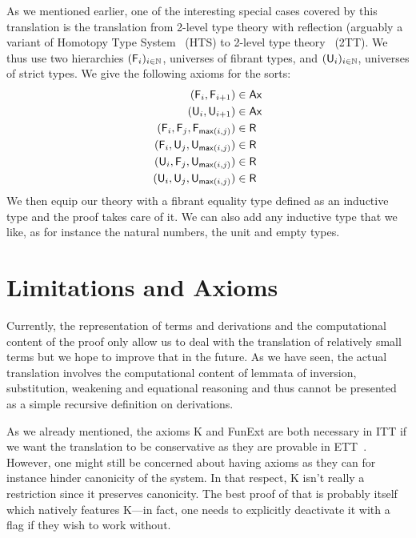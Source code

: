 
As we mentioned earlier, one of the interesting special cases covered by this
translation is the translation from 2-level type theory with reflection
(arguably a variant of Homotopy Type System~\cite{hts-sota} (HTS) to 2-level
type theory~\cite{altenkirch2016extending} (2TT).
%
We thus use two hierarchies $(\mathsf{F}_{i})_{i \in \mathbb{N}}$, universes of fibrant
types, and $(\mathsf{U}_{i})_{i \in \mathbb{N}}$, universes of strict types.
We give the following axioms for the sorts:
%
\begin{align*}
  (\mathsf{F}_{i}, \mathsf{F}_{i+1}) &\in \mathsf{Ax} \\
  (\mathsf{U}_{i}, \mathsf{U}_{i+1}) &\in \mathsf{Ax} \\
  (\mathsf{F}_{i}, \mathsf{F}_{j}, \mathsf{F}_{\mathsf{max}(i,j)}) &\in \mathsf{R} \\
  (\mathsf{F}_{i}, \mathsf{U}_{j}, \mathsf{U}_{\mathsf{max}(i,j)}) &\in \mathsf{R} \\
  (\mathsf{U}_{i}, \mathsf{F}_{j}, \mathsf{U}_{\mathsf{max}(i,j)}) &\in \mathsf{R} \\
  (\mathsf{U}_{i}, \mathsf{U}_{j}, \mathsf{U}_{\mathsf{max}(i,j)}) &\in \mathsf{R}
\end{align*}
%
We then equip our theory with a fibrant equality type defined as an inductive
type and the proof takes care of it. We can also add any inductive type that we
like, as for instance the natural numbers, the unit and empty types.

\section{Limitations and Axioms}
\label{sec:axioms}

Currently, the representation of terms and derivations and the
computational content of the proof only allow us to deal with the
translation of relatively small terms but we hope to improve that in
the future. As we have seen, the actual translation involves the
computational content of lemmata of inversion, substitution, weakening
and equational reasoning and thus cannot be presented as a simple
recursive definition on derivations.


As we already mentioned, the axioms K and FunExt are both
necessary in ITT if we want the translation to be conservative as they are
provable in ETT~\cite{hofmann1995conservativity}.
However, one might still be concerned about having axioms
as they can for instance hinder canonicity of the system.
In that respect, K isn't really a restriction since it preserves canonicity.
The best proof of that is probably \Agda itself which natively features K---in
fact, one needs to explicitly deactivate it with a flag if they wish to work
without.

